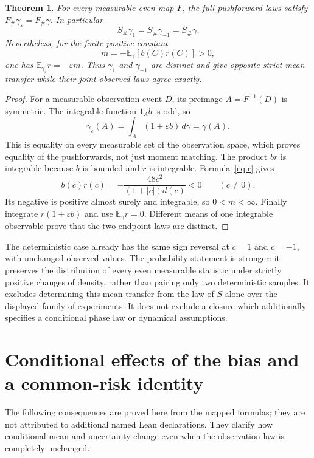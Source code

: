 \documentclass[11pt]{article}
\newtheorem{theorem}{Theorem}[section]
\newcommand{\E}{\mathbb E}\newcommand{\Var}{\operatorname{Var}}
\begin{document}
\begin{theorem}\label{thm:tilts}
For every measurable even map $F$, the full pushforward laws satisfy
$F_\#\gamma_\varepsilon=F_\#\gamma$. In particular
\[
 S_\#\gamma_1=S_\#\gamma_{-1}=S_\#\gamma.
\]
Nevertheless, for the finite positive constant
\[
 m=-\E_\gamma[b(C)r(C)]>0,
\]
one has $\E_{\gamma_\varepsilon}r=-\varepsilon m$.
Thus $\gamma_1$ and $\gamma_{-1}$ are distinct and give opposite
strict mean transfer while their joint observed laws agree exactly.
\end{theorem}
\begin{proof}
For a measurable observation event $D$, its preimage $A=F^{-1}(D)$
is symmetric. The integrable function $1_A b$ is odd, so
\[
 \gamma_\varepsilon(A)=\int_A(1+\varepsilon b)\,d\gamma
                         =\gamma(A).
\]
This is equality on every measurable set of the observation space,
which proves equality of the pushforwards, not just moment matching.
The product $br$ is integrable because $b$ is bounded and $r$ is
integrable. Formula~\eqref{eq:r} gives
\[
 b(c)r(c)=-\frac{48c^2}{(1+|c|)d(c)}<0\qquad(c\ne0).
\]
Its negative is positive almost surely and integrable, so $0<m<\infty$.
Finally integrate $r(1+\varepsilon b)$ and use $\E_\gamma r=0$.
Different means of one integrable observable prove that the two
endpoint laws are distinct.
\end{proof}

The deterministic case already has the same sign reversal at $c=1$
and $c=-1$, with unchanged observed values. The probability statement
is stronger: it preserves the distribution of every even measurable
statistic under strictly positive changes of density, rather than
pairing only two deterministic samples. It excludes determining this
mean transfer from the law of $S$ alone over the displayed family of
experiments. It does not exclude a closure which additionally specifies
a conditional phase law or dynamical assumptions.

\section{Conditional effects of the bias and a common-risk identity}
The following consequences are proved here from the mapped formulas;
they are not attributed to additional named Lean declarations.
They clarify how conditional mean and uncertainty change even when
the observation law is completely unchanged.
\end{document}
